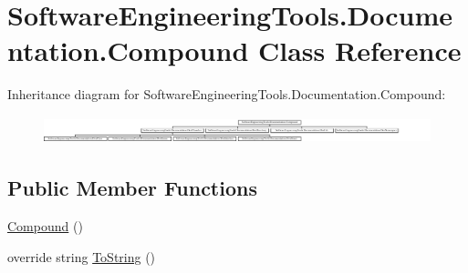 \hypertarget{class_software_engineering_tools_1_1_documentation_1_1_compound}{\section{Software\+Engineering\+Tools.\+Documentation.\+Compound Class Reference}
\label{class_software_engineering_tools_1_1_documentation_1_1_compound}
}
Inheritance diagram for Software\+Engineering\+Tools.\+Documentation.\+Compound\+:\begin{figure}[H]
\begin{center}
\leavevmode
\includegraphics[height=0.806916cm]{class_software_engineering_tools_1_1_documentation_1_1_compound}
\end{center}
\end{figure}
\subsection*{Public Member Functions}
\begin{DoxyCompactItemize}
\item 
\hyperlink{class_software_engineering_tools_1_1_documentation_1_1_compound_a4e7df725cc78a016399778b91e261bd0}{Compound} ()
\item 
override string \hyperlink{class_software_engineering_tools_1_1_documentation_1_1_compound_a2450d96253aafa7fd3384b67b1ab01d8}{To\+String} ()
\end{DoxyCompactItemize}
